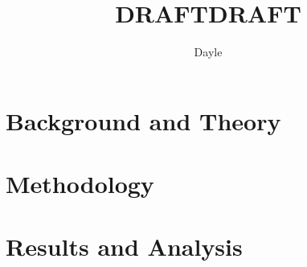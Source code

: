 \documentclass{article}
\begin{document}
\ifdraft
	\author{Dayle}
	\title{DRAFT}
	\maketitle
    \tableofcontents
\else
	\frontmatter
    \title{DRAFT}
    \tableofcontents
    \listoffigures
    \mainmatter
\fi

\pagebreak

	

	\chapter{Background and Theory} \label{background}
	
	
	
	
	
	
	
	
	\chapter{Methodology} \label{methodology}
	
	
	

	\chapter{Results and Analysis} \label{results}
	


\pagebreak
\ifdraft
 	\printbibliography
\else
	\backmatter
\fi
\end{document}
